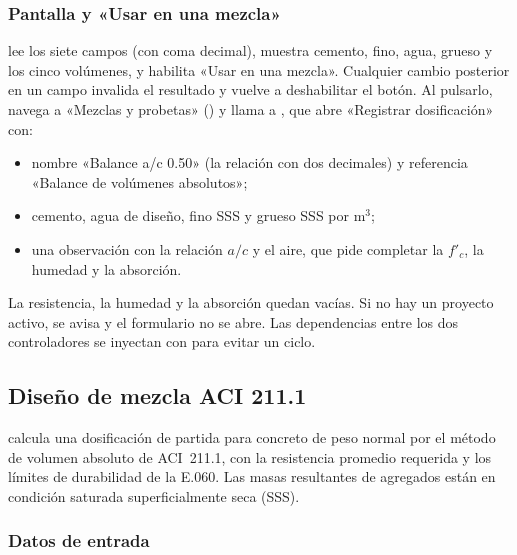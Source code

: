 \subsubsection{Pantalla y «Usar en una mezcla»}

 lee los siete campos (con coma decimal), muestra cemento, fino, agua, grueso y los cinco
volúmenes, y habilita «Usar en una mezcla». Cualquier cambio posterior en un campo invalida el resultado y vuelve a
deshabilitar el botón. Al pulsarlo,  navega a «Mezclas y probetas»
() y llama a , que abre
«Registrar dosificación» con:

\begin{itemize}
	\item nombre «Balance a/c 0.50» (la relación con dos decimales) y referencia «Balance de volúmenes absolutos»;
	\item cemento, agua de diseño, fino SSS y grueso SSS por m$^3$;
	\item una observación con la relación $a/c$ y el aire, que pide completar la $f'_c$, la humedad y la absorción.
\end{itemize}

La resistencia, la humedad y la absorción quedan vacías. Si no hay un proyecto activo, se avisa y el formulario no se
abre. Las dependencias entre los dos controladores se inyectan con  para evitar un ciclo.

\subsection{Diseño de mezcla ACI 211.1}
\label{sec:con-aci}

 calcula una dosificación de partida para concreto de peso
normal por el método de volumen absoluto de ACI~211.1, con la resistencia promedio requerida y los límites de
durabilidad de la E.060. Las masas resultantes de agregados están en condición saturada superficialmente seca (SSS).

\subsubsection{Datos de entrada}

